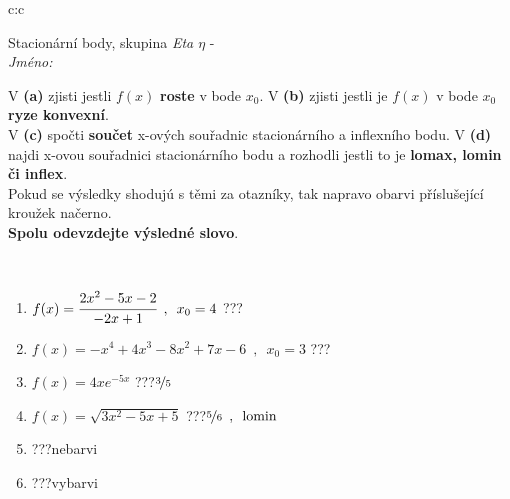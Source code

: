 \documentclass[10pt]{report}
\begin{document}
\newpage
\thispagestyle{empty}
\begin{tabular}{c:c}
\begin{minipage}[c][104.5mm][t]{0.5\linewidth}
\begin{center}
\vspace{7mm}
{\huge Stacionární body, skupina \textit{Eta $\eta$} -}\\[5mm]
\textit{Jméno:}\phantom{xxxxxxxxxxxxxxxxxxxxxxxxxxxxxxxxxxxxxxxxxxxxxxxxxxxxxxxxxxxxxxxxx}\\[5mm]
\begin{minipage}{0.95\linewidth}
\begin{center}
{\small V \textbf{(a)} zjisti jestli $f(x)$ \textbf{roste} v bode $x_0$. V \textbf{(b)} zjisti jestli je $f(x)$ v bode $x_0$ \textbf{ryze konvexní}.\\V \textbf{(c)} spočti \textbf{součet} x-ových souřadnic stacionárního a inflexního bodu. V \textbf{(d)} najdi x-ovou souřadnici stacionárního bodu a rozhodli jestli to je \textbf{lomax, lomin či inflex}.\\Pokud se výsledky shodujú s těmi za otazníky, tak napravo obarvi příslušející kroužek načerno.\\\textbf{Spolu odevzdejte výsledné slovo}}.
\end{center}
\end{minipage}
\\[1mm]
\begin{minipage}{0.79\linewidth}
\begin{center}
\begin{varwidth}{\linewidth}
\begin{enumerate}
\normalsize
\item $f(x)=\cfrac{2x^2-5x-2}{-2x+1}\enspace , \enspace x_0=4$\quad \dotfill\; ???\;\dotfill \quad {}
\item $f(x)=-x^4+4x^3-8x^2+7x-6\enspace , \enspace x_0=3$\quad \dotfill\; ???\;\dotfill \quad {}
\item $f(x)=4xe^{-5x}$\quad \dotfill\; ???\;\dotfill \quad $\nicefrac{3}{5}$
\item $f(x)=\sqrt{3x^2-5x+5}$\quad \dotfill\; ???\;\dotfill \quad $\nicefrac{5}{6}\enspace , \enspace \mathrm{lomin}$
\item \quad \dotfill\; ???\;\dotfill \quad nebarvi
\item \quad \dotfill\; ???\;\dotfill \quad vybarvi
\end{enumerate}
\end{varwidth}
\end{center}

\end{minipage}
\end{center}
\end{minipage}
\end{tabular}
\end{document}
